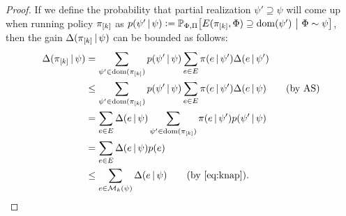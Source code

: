 \begin{proof}
  If we define the probability that partial realization $\psi' \supseteq \psi$ will come up when running policy $\pi_{[k]}$ as $p(\psi'\mmid\psi) \defeq \P[\Phi,\Pi]{E(\pik, \Phi) \supseteq \dom(\psi')}[\Phi \sim \psi]$, then the gain $\Delta(\pi_{[k]}\,\vert\,\psi)$ can be bounded as follows:
  \begin{align*}
    \D{\pik}{\psi} &= \sum_{\psi' \in \dom(\pik)}p(\psi'\mmid\psi)\sum_{e \in E}\pi(e\mmid\psi')\D{e}{\psi'}\\
    &\leq \sum_{\psi' \in \dom(\pik)}p(\psi'\mmid\psi)\sum_{e \in E}\pi(e\mmid\psi')\D{e}{\psi} \tag*{(by AS)}\\
    &= \sum_{e \in E}\D{e}{\psi} \sum_{\psi' \in \dom(\pik)}\pi(e\mmid\psi')p(\psi'\mmid\psi)\\
    &= \sum_{e \in E}\D{e}{\psi} p(e)\\
    &\leq \sum_{e \in \mathcal{M}_k(\psi)} \D{e}{\psi} \tag*{(by \eqref{eq:knap})}.
  \end{align*}
\end{proof}

